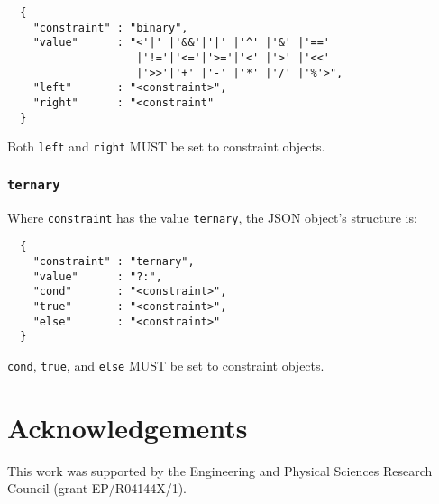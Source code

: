 \documentclass[10pt,twocolumn,a4paper]{article}
\begin{document}
\begin{verbatim}
  {
    "constraint" : "binary",
    "value"      : "<'|' |'&&'|'|' |'^' |'&' |'=='
                    |'!='|'<='|'>='|'<' |'>' |'<<'
                    |'>>'|'+' |'-' |'*' |'/' |'%'>",
    "left"       : "<constraint>",
    "right"	     : "<constraint"
  }
\end{verbatim}

Both \texttt{left} and \texttt{right} MUST be set to constraint objects.

\subsubsection{\texttt{ternary}}

Where \texttt{constraint} has the value \texttt{ternary}, the JSON object's structure is:

\begin{verbatim}
  {
    "constraint" : "ternary",
    "value"      : "?:",
    "cond"       : "<constraint>",
    "true"       : "<constraint>",
    "else"       : "<constraint>"
  }
\end{verbatim}

\texttt{cond}, \texttt{true}, and \texttt{else} MUST be set to constraint objects.

\section{Acknowledgements}

This work was supported by the Engineering and Physical Sciences Research
Council (grant EP/R04144X/1).



\ifpdf
  \ifdefined\pdftrailerid
    \pdftrailerid{}
  \fi
\fi
\end{document}

